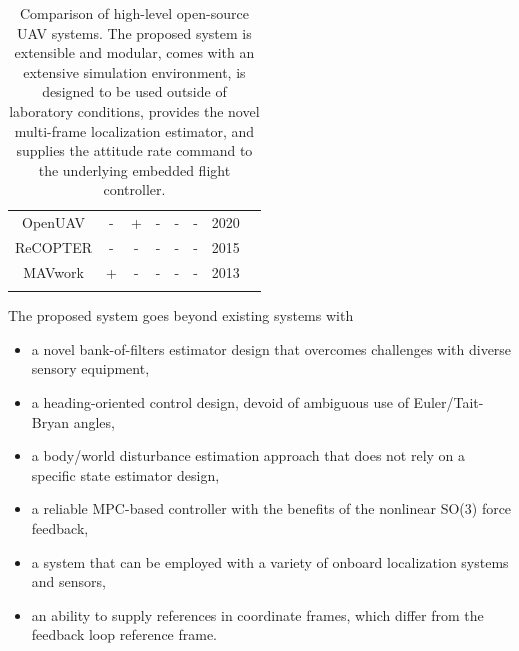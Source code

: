 \documentclass[a4paper,11pt,titlepage,twoside]{book}
\begin{document}
\begin{table}
\begin{tabular}{c|c|c|c|c|c|c|c}
    \small OpenUAV                        & \small -                            & \small +          & \small -          & \small -                                 & \small -                                & \small 2020                                  & \small \cite{schmittle2018openuav}        \\
    \small ReCOPTER                       & \small -                            & \small -          & \small -          & \small -                                 & \small -                                & \small 2015                                  & \small \cite{abeywardena2015design}       \\
    \small MAVwork                        & \small +                            & \small -          & \small -          & \small -                                 & \small -                                & \small 2013                                  & \small \cite{mellado2013mavwork}          \\
\noalign{\smallskip}\hline
  \end{tabular}
  \caption{Comparison of high-level open-source \ac{UAV} systems. The proposed system is extensible and modular, comes with an extensive simulation environment, is designed to be used outside of laboratory conditions, provides the novel multi-frame localization estimator, and supplies the attitude rate command to the underlying embedded flight controller.\label{tab:uav_systems}}
\end{table}

The proposed system goes beyond existing systems with
\begin{itemize}
  \item a novel bank-of-filters estimator design that overcomes challenges with diverse sensory equipment,
  \item a heading-oriented control design, devoid of ambiguous use of Euler/Tait-Bryan angles,
  \item a body/world disturbance estimation approach that does not rely on a specific state estimator design,
  \item a reliable MPC-based controller with the benefits of the nonlinear SO(3) force feedback,
  \item a system that can be employed with a variety of onboard localization systems and sensors,
  \item an ability to supply references in coordinate frames, which differ from the feedback loop reference frame.
\end{itemize}
\end{document}
